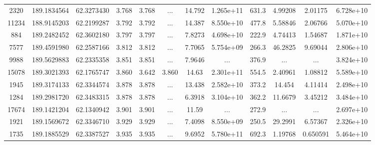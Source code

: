 \begin{table*}
\begin{tabular}{cccccccccccc}
           2320 &     189.1834564 &      62.3273430 &           3.768 &           3.768 &             ... &          14.792 &       1.265e+11 &           631.3 &         4.99208 &         2.01175 &       6.728e+10 \\
          11234 &     188.9145203 &      62.2199287 &           3.792 &           3.792 &             ... &          14.387 &       8.550e+10 &           477.8 &         5.58846 &         2.06766 &       5.070e+10 \\
            884 &     189.2482452 &      62.3602180 &           3.797 &           3.797 &             ... &          7.8273 &       4.698e+10 &           222.9 &         4.74413 &         1.54687 &       1.871e+10 \\
           7577 &     189.4591980 &      62.2587166 &           3.812 &           3.812 &             ... &          7.7065 &       5.754e+09 &           266.3 &         46.2825 &         9.69044 &       2.806e+10 \\
           9988 &     189.5629883 &      62.2335358 &           3.851 &           3.851 &             ... &          7.9646 &             ... &           376.9 &             ... &             ... &       3.824e+10 \\
          15078 &     189.3021393 &      62.1765747 &           3.860 &           3.642 &           3.860 &           14.63 &       2.301e+11 &           554.5 &         2.40961 &         1.08812 &       5.589e+10 \\
           1945 &     189.3174133 &      62.3344574 &           3.878 &           3.878 &             ... &          13.438 &       2.582e+10 &           373.2 &          14.454 &         4.11414 &       2.498e+10 \\
           1284 &     189.2981720 &      62.3483315 &           3.878 &           3.878 &             ... &          6.3918 &       3.104e+10 &           362.2 &         11.6679 &         3.45212 &       3.484e+10 \\
          17674 &     189.1421204 &      62.1340942 &           3.901 &           3.901 &             ... &           11.59 &             ... &           272.9 &             ... &             ... &       2.697e+10 \\
           1921 &     189.1569672 &      62.3346710 &           3.929 &           3.929 &             ... &          7.4098 &       8.550e+09 &           250.5 &         29.2991 &         6.57367 &       2.326e+10 \\
           1735 &     189.1885529 &      62.3387527 &           3.935 &           3.935 &             ... &          9.6952 &       5.780e+11 &           692.3 &         1.19768 &        0.650591 &       5.464e+10 \\

\end{tabular}
\end{table*}
